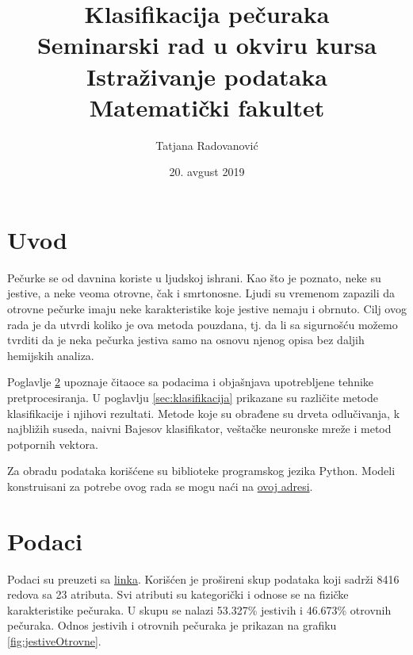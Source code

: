\documentclass[a4paper]{article}
\begin{document}
\title{Klasifikacija pe\v curaka\\ \small{Seminarski rad u okviru kursa\\Istraživanje podataka\\ Matematički fakultet}}

\author{Tatjana Radovanović\\}

\date{20. avgust 2019}

\maketitle


\tableofcontents

\newpage

\section{Uvod}
\label{sec:uvod}
Pečurke se od davnina koriste u ljudskoj ishrani. Kao što je poznato, neke su jestive, a neke veoma otrovne, čak i smrtonosne. Ljudi su vremenom zapazili da otrovne pečurke imaju neke karakteristike koje jestive nemaju i obrnuto. Cilj ovog rada je da utvrdi koliko je ova metoda pouzdana, tj. da li sa sigurnošću možemo tvrditi da je neka pečurka jestiva samo na osnovu njenog opisa bez daljih hemijskih analiza.

Poglavlje \ref{sec:podaci} upoznaje čitaoce sa podacima i objašnjava upotrebljene tehnike pretprocesiranja. U poglavlju \ref{sec:klasifikacija} prikazane su različite metode klasifikacije i njihovi rezultati. Metode koje su obrađene su drveta odlučivanja, k najbližih suseda, naivni Bajesov klasifikator, veštačke neuronske mreže i metod potpornih vektora.

Za obradu podataka korišćene su biblioteke programskog jezika Python. Modeli konstruisani za potrebe ovog rada se mogu naći na \href{https://github.com/Tatjana95/IP-Mushrooms}{ovoj adresi}.


\section{Podaci}
\label{sec:podaci}

Podaci su preuzeti sa \href{https://archive.ics.uci.edu/ml/datasets/Mushroom}{linka}. Korišćen je prošireni skup podataka koji sadrži 8416 redova sa 23 atributa.  Svi atributi su kategorički i odnose se na fizičke karakteristike pečuraka. U skupu se nalazi 53.327\% jestivih i 46.673\% otrovnih pečuraka. Odnos jestivih i otrovnih pečuraka je prikazan na grafiku \ref{fig:jestiveOtrovne}.
\end{document}

